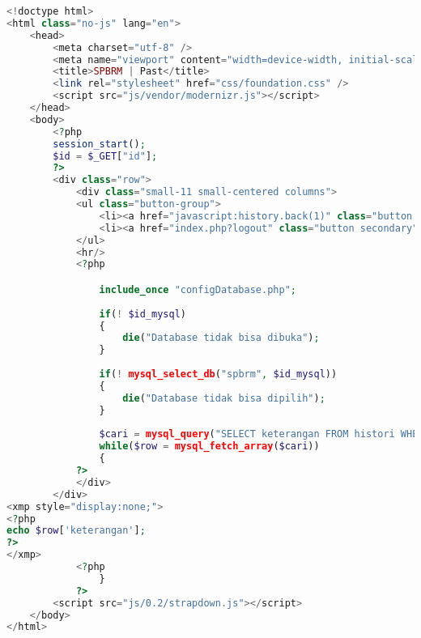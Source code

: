 \begin{lstlisting}[language=php,basicstyle=\tiny,caption=past.php]
<!doctype html>
<html class="no-js" lang="en">
	<head>
		<meta charset="utf-8" />
		<meta name="viewport" content="width=device-width, initial-scale=1.0" />
		<title>SPBRM | Past</title>
		<link rel="stylesheet" href="css/foundation.css" />
		<script src="js/vendor/modernizr.js"></script>
	</head>
	<body>
		<?php
		session_start();
		$id = $_GET["id"];
		?>
		<div class="row">
			<div class="small-11 small-centered columns">
			<ul class="button-group">
				<li><a href="javascript:history.back(1)" class="button secondary">Kembali</a></li>
				<li><a href="index.php?logout" class="button secondary">Logout</a></li>
			</ul>
			<hr/>
			<?php

				include_once "configDatabase.php";
				
				if(! $id_mysql)
				{
					die("Database tidak bisa dibuka");
				}
					
				if(! mysql_select_db("spbrm", $id_mysql))
				{
					die("Database tidak bisa dipilih");
				}
				
				$cari = mysql_query("SELECT keterangan FROM histori WHERE id_histori='$id'", $id_mysql);
				while($row = mysql_fetch_array($cari))
				{
			?>
			</div>
		</div>
<xmp style="display:none;">
<?php
echo $row['keterangan'];
?>
</xmp>
			<?php
				}
			?>
		<script src="js/0.2/strapdown.js"></script>
	</body>
</html>
\end{lstlisting}

